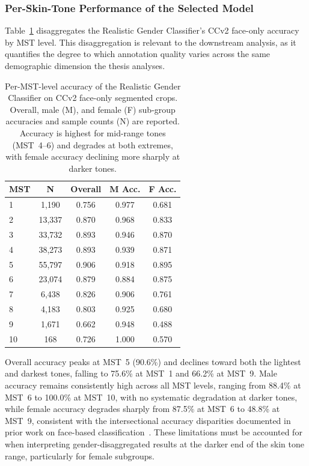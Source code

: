 \subsubsection{Per-Skin-Tone Performance of the Selected Model}

Table~\ref{tab:gender_skintone} disaggregates the Realistic Gender Classifier's CCv2 face-only accuracy by MST level. This disaggregation is relevant to the downstream analysis, as it quantifies the degree to which annotation quality varies across the same demographic dimension the thesis analyses.

\begin{table}[htbp]
	\centering
	\caption{Per-MST-level accuracy of the Realistic Gender Classifier on CCv2 face-only segmented crops. Overall, male (M), and female (F) sub-group accuracies and sample counts (N) are reported. Accuracy is highest for mid-range tones (MST~4--6) and degrades at both extremes, with female accuracy declining more sharply at darker tones.}
	\label{tab:gender_skintone}
	\small
	\begin{tabular}{lcccc}
		\toprule
		\textbf{MST} & \textbf{N} & \textbf{Overall} & \textbf{M Acc.} & \textbf{F Acc.} \\
		\midrule
		1  & 1{,}190  & 0.756 & 0.977 & 0.681 \\
		2  & 13{,}337 & 0.870 & 0.968 & 0.833 \\
		3  & 33{,}732 & 0.893 & 0.946 & 0.870 \\
		4  & 38{,}273 & 0.893 & 0.939 & 0.871 \\
		5  & 55{,}797 & 0.906 & 0.918 & 0.895 \\
		6  & 23{,}074 & 0.879 & 0.884 & 0.875 \\
		7  & 6{,}438  & 0.826 & 0.906 & 0.761 \\
		8  & 4{,}183  & 0.803 & 0.925 & 0.680 \\
		9  & 1{,}671  & 0.662 & 0.948 & 0.488 \\
		10 & 168      & 0.726 & 1.000 & 0.570 \\
		\bottomrule
	\end{tabular}
\end{table}

Overall accuracy peaks at MST~5 (90.6\%) and declines toward both the lightest and darkest tones, falling to 75.6\% at MST~1 and 66.2\% at MST~9. Male accuracy remains consistently high across all MST levels, ranging from 88.4\% at MST~6 to 100.0\% at MST~10, with no systematic degradation at darker tones, while female accuracy degrades sharply from 87.5\% at MST~6 to 48.8\% at MST~9, consistent with the intersectional accuracy disparities documented in prior work on face-based classification~\cite{Buolamwini_2018_BiasGenderClassification, Buolamwini_2018_GenderShades}. These limitations must be accounted for when interpreting gender-disaggregated results at the darker end of the skin tone range, particularly for female subgroups.

